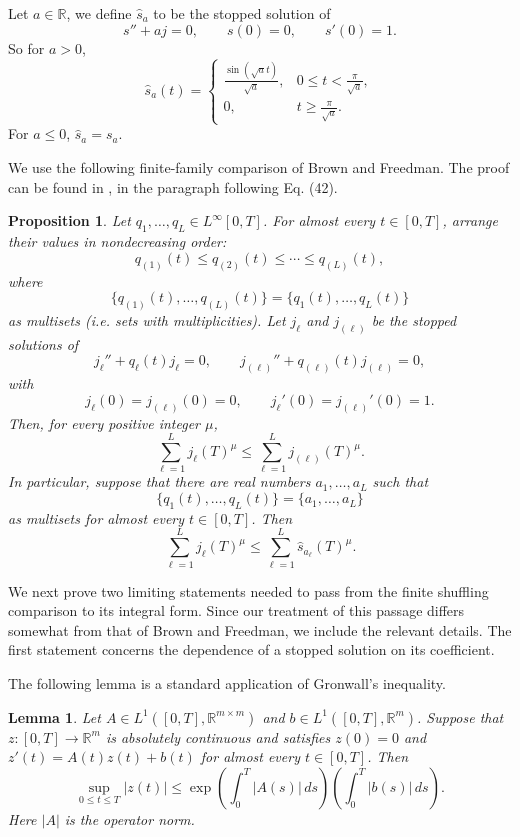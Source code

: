 \documentclass[11pt, reqno]{amsart}
\newtheorem{lemma}{Lemma}
\newtheorem{proposition}{Proposition}
\begin{document}
Let $a\in \mathbb R$, we define $\widehat s_a$ to be the stopped solution of
$$
s''+aj=0, \qquad s(0)=0, \qquad s'(0)=1.
$$
So for $a>0$,
\begin{equation}\label{eq:stopped-sine}
\widehat{s}_a(t)=
\begin{cases}
\frac{\sin (\sqrt{a} t)}{\sqrt{a}}, & 0 \le t<\frac{\pi}{\sqrt{a}}, \\
0, & t \ge \frac{\pi}{\sqrt{a}}.
\end{cases}
\end{equation}
For $a\le0$, $\widehat s_a=s_a$.

We use the following finite-family comparison of Brown and Freedman. The proof can be found in \cite[Section~2.5] {BrownFreedman2022}, in the paragraph following Eq. (42).

\begin{proposition}\cite{BrownFreedman2022}
\label{prop:finite-BF}
Let $q_1, \ldots, q_L\in L^\infty[0, T]$. For almost every $t\in[0, T]$, arrange their values in nondecreasing order:
$$q_{(1)}(t)\le q_{(2)}(t)\le \cdots\le q_{(L)}(t), $$
where
$$
\{q_{(1)}(t), \ldots, q_{(L)}(t)\} = \{q_1(t), \ldots, q_L(t)\}
$$
as multisets (i.e. sets with multiplicities). Let $j_\ell$ and $j_{(\ell)}$ be the stopped solutions of
$$
j_\ell''+q_\ell(t)j_\ell=0, \qquad j_{(\ell)}''+q_{(\ell)}(t)j_{(\ell)}=0,
$$
with
$$
j_\ell(0)=j_{(\ell)}(0)=0, \qquad j_\ell'(0)=j_{(\ell)}'(0)=1.
$$
Then, for every positive integer $\mu$,
\begin{equation*}\label{eq:finite-BF-general}
\sum_{\ell=1}^{L}j_\ell(T)^\mu \le \sum_{\ell=1}^{L}j_{(\ell)}(T)^\mu.
\end{equation*}
In particular, suppose that there are real numbers $a_1, \ldots, a_L$ such that
$$
\{q_1(t), \ldots, q_L(t)\} = \{a_1, \ldots, a_L\}
$$
as multisets for almost every $t\in[0, T]$. Then
\begin{equation*}\label{eq:finite-BF}
\sum_{\ell=1}^{L}j_\ell(T)^\mu
\le
\sum_{\ell=1}^{L}\widehat s_{a_\ell}(T)^\mu.
\end{equation*}
\end{proposition}

We next prove two limiting statements needed to pass from the finite shuffling comparison to its integral form. Since our treatment of this passage differs somewhat from that of Brown and Freedman, we include the relevant details. The first statement concerns the dependence of a stopped solution on its coefficient.

The following lemma is a standard application of Gronwall's inequality.
\begin{lemma}
\label{lem:linear-system-estimate}
Let $A\in L^1([0, T], \mathbb R^{m\times m})$ and $b\in L^1([0, T], \mathbb R^m)$. Suppose that $z\colon[0, T]\to\mathbb R^m$ is absolutely continuous and satisfies $z(0)=0$ and $z'(t)=A(t)z(t)+b(t)$ for almost every $t\in[0, T]$. Then
\begin{equation*}\label{eq:linear-system-estimate}
\sup_{0\le t\le T}|z(t)|
\le \exp\left(\int_0^T|A(s)|\, ds\right) \left(\int_0^T|b(s)|\, ds \right).
\end{equation*}
Here $|A|$ is the operator norm.
\end{lemma}
\end{document}
